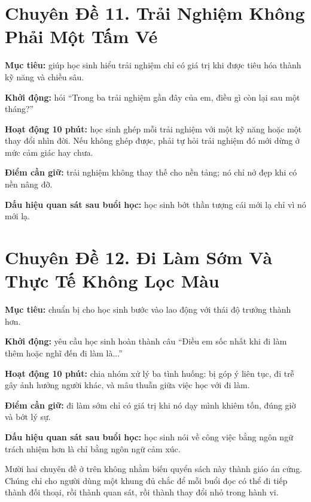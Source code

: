 \section*{Chuyên Đề 11. Trải Nghiệm Không Phải Một Tấm Vé}

\begin{goigiaovien}
\textbf{Mục tiêu:} giúp học sinh hiểu trải nghiệm chỉ có giá trị khi được tiêu hóa thành kỹ năng và chiều sâu.

\textbf{Khởi động:} hỏi ``Trong ba trải nghiệm gần đây của em, điều gì còn lại sau một tháng?''

\textbf{Hoạt động 10 phút:} học sinh ghép mỗi trải nghiệm với một kỹ năng hoặc một thay đổi nhìn đời. Nếu không ghép được, phải tự hỏi trải nghiệm đó mới dừng ở mức cảm giác hay chưa.

\textbf{Điểm cần giữ:} trải nghiệm không thay thế cho nền tảng; nó chỉ nở đẹp khi có nền nâng đỡ.

\textbf{Dấu hiệu quan sát sau buổi học:} học sinh bớt thần tượng cái mới lạ chỉ vì nó mới lạ.
\end{goigiaovien}

\section*{Chuyên Đề 12. Đi Làm Sớm Và Thực Tế Không Lọc Màu}

\begin{goigiaovien}
\textbf{Mục tiêu:} chuẩn bị cho học sinh bước vào lao động với thái độ trưởng thành hơn.

\textbf{Khởi động:} yêu cầu học sinh hoàn thành câu ``Điều em sốc nhất khi đi làm thêm hoặc nghĩ đến đi làm là...''

\textbf{Hoạt động 10 phút:} chia nhóm xử lý ba tình huống: bị góp ý liên tục, đi trễ gây ảnh hưởng người khác, và mâu thuẫn giữa việc học với đi làm.

\textbf{Điểm cần giữ:} đi làm sớm chỉ có giá trị khi nó dạy mình khiêm tốn, đúng giờ và bớt lý sự.

\textbf{Dấu hiệu quan sát sau buổi học:} học sinh nói về công việc bằng ngôn ngữ trách nhiệm hơn là chỉ bằng ngôn ngữ cảm xúc.
\end{goigiaovien}

\begin{tongketchuong}
Mười hai chuyên đề ở trên không nhằm biến quyển sách này thành giáo án cứng. Chúng chỉ cho người dùng một khung đủ chắc để mỗi buổi đọc có thể đi tiếp thành đối thoại, rồi thành quan sát, rồi thành thay đổi nhỏ trong hành vi.
\end{tongketchuong}

\ngancach
